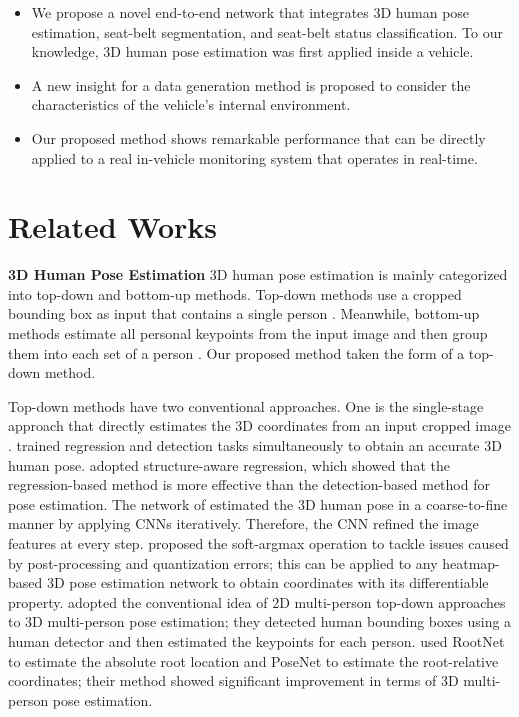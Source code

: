 \documentclass[letterpaper]{article} %
\begin{document}
\begin{itemize}
\item We propose a novel end-to-end network that integrates 3D human pose estimation, seat-belt segmentation, and seat-belt status classification. To our knowledge, 3D human pose estimation was first applied inside a vehicle.
\item A new insight for a data generation method is proposed to consider the characteristics of the vehicle's internal environment.
\item Our proposed method shows remarkable performance that can be directly applied to a real in-vehicle monitoring system that operates in real-time.
\end{itemize}

\section{Related Works}
\textbf{3D Human Pose Estimation}
3D human pose estimation is mainly categorized into top-down and bottom-up methods. Top-down methods use a cropped bounding box as input that contains a single person \cite{li20143d, sun2017compositional, pavlakos2017coarse, sun2018integral, moon2019camera, martinez2017simple, nie2017monocular, gong2021poseaug, llopart2020liftformer}. Meanwhile, bottom-up methods estimate all personal keypoints from the input image and then group them into each set of a person \cite{fabbri2020compressed, li2020hmor, lin2020hdnet, mehta2020xnect, wang2010combined}. Our proposed method taken the form of a top-down method. 

Top-down methods have two conventional approaches. One is the single-stage approach that directly estimates the 3D coordinates from an input cropped image \cite{li20143d, sun2017compositional, pavlakos2017coarse, sun2018integral, moon2019camera}. \cite{li20143d} trained regression and detection tasks simultaneously to obtain an accurate 3D human pose. \cite{sun2017compositional} adopted structure-aware regression, which showed that the regression-based method is more effective than the detection-based method for pose estimation. The network of \cite{pavlakos2017coarse} estimated the 3D human pose in a coarse-to-fine manner by applying CNNs iteratively. Therefore, the CNN refined the image features at every step. \cite{sun2018integral} proposed the soft-argmax operation to tackle issues caused by post-processing and quantization errors; this can be applied to any heatmap-based 3D pose estimation network to obtain coordinates with its differentiable property. \cite{moon2019camera} adopted the conventional idea of 2D multi-person top-down approaches to 3D multi-person pose estimation; they detected human bounding boxes using a human detector and then estimated the keypoints for each person. \cite{moon2019camera} used RootNet to estimate the absolute root location and PoseNet to estimate the root-relative coordinates; their method showed significant improvement in terms of 3D multi-person pose estimation.
\end{document}
